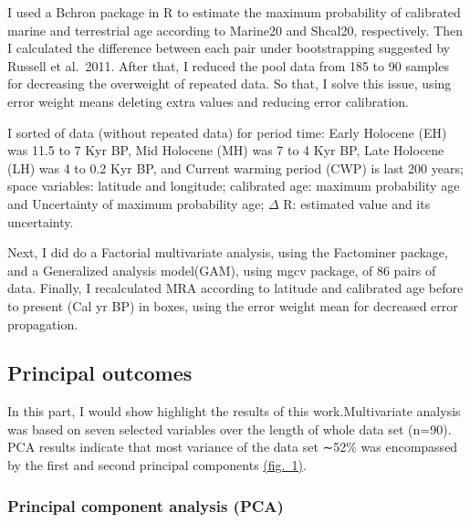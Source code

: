 \documentclass[
]{article}
\begin{document}
I used a Bchron package in R to estimate the maximum probability of
calibrated marine and terrestrial age according to Marine20 and Shcal20,
respectively. Then I calculated the difference between each pair under
bootstrapping suggested by Russell et al.~2011. After that, I reduced
the pool data from 185 to 90 samples for decreasing the overweight of
repeated data. So that, I solve this issue, using error weight means
deleting extra values and reducing error calibration.

I sorted of data (without repeated data) for period time: Early Holocene
(EH) was 11.5 to 7 Kyr BP, Mid Holocene (MH) was 7 to 4 Kyr BP, Late
Holocene (LH) was 4 to 0.2 Kyr BP, and Current warming period (CWP) is
last 200 years; space variables: latitude and longitude; calibrated age:
maximum probability age and Uncertainty of maximum probability age;
\(\Delta\) R: estimated value and its uncertainty.

Next, I did do a Factorial multivariate analysis, using the Factominer
package, and a Generalized analysis model(GAM), using mgcv package, of
86 pairs of data. Finally, I recalculated MRA according to latitude and
calibrated age before to present (Cal yr BP) in boxes, using the error
weight mean for decreased error propagation.

\hypertarget{principal-outcomes}{%
\subsection{Principal outcomes}\label{principal-outcomes}}

In this part, I would show highlight the results of this
work.Multivariate analysis was based on seven selected variables over
the length of whole data set (n=90). PCA results indicate that most
variance of the data set ∼52\% was encompassed by the first and second
principal components
\protect\hyperlink{principal-component-analysis-ux28pcaux29}{(fig.~1)}.

\hypertarget{principal-component-analysis-pca}{%
\subsubsection{Principal component analysis
(PCA)}\label{principal-component-analysis-pca}}
\end{document}
